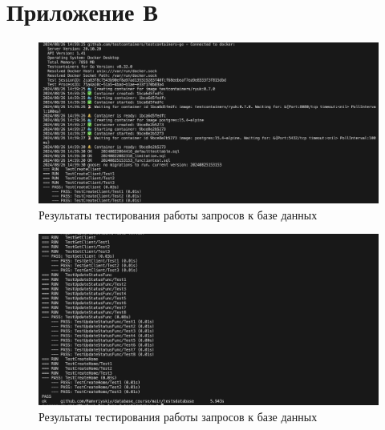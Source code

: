 \chapter*{Приложение В}

\begin{figure}[H]
    \includegraphics[width=1\linewidth]{./img/test2.png}
    \caption{\label{img:test1} Результаты тестирования работы запросов к базе данных}
\end{figure}
\noindent

\begin{figure}[H]
    \includegraphics[width=1\linewidth]{./img/test1.png}
    \caption{\label{img:test2} Результаты тестирования работы запросов к базе данных}
\end{figure}
\noindent